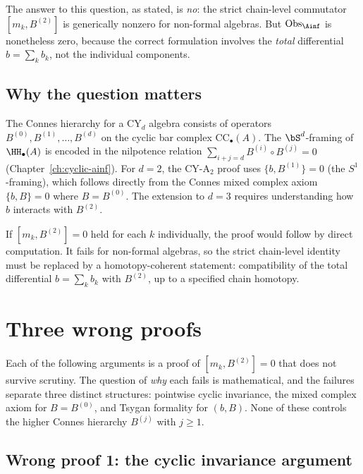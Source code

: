 The answer to this question, as stated, is \emph{no}: the strict
chain-level commutator $[m_k, B^{(2)}]$ is generically nonzero for
non-formal algebras.  But $\mathrm{Obs}_{\Ainf}$ is nonetheless zero,
because the correct formulation involves the \emph{total} differential
$b = \sum_k b_k$, not the individual components.


\subsection{Why the question matters}
\label{subsec:m3b2-why}

The Connes hierarchy for a CY$_d$ algebra consists of operators
$B^{(0)}, B^{(1)}, \ldots, B^{(d)}$ on the cyclic bar complex
$\mathrm{CC}_\bullet(A)$.  The $\bS^d$-framing of $\HH_\bullet(A)$
is encoded in the nilpotence relation
$\sum_{i+j=d} B^{(i)} \circ B^{(j)} = 0$
(Chapter~\ref{ch:cyclic-ainf}).  For $d = 2$, the CY-A$_2$
proof uses $\{b, B^{(1)}\} = 0$ (the $S^1$-framing), which
follows directly from the Connes mixed complex axiom
$\{b, B\} = 0$ where $B = B^{(0)}$.  The extension to $d = 3$
requires understanding how $b$ interacts with $B^{(2)}$.

If $[m_k, B^{(2)}] = 0$ held for each $k$ individually, the
proof would follow by direct computation.  It fails for non-formal
algebras, so the strict chain-level identity must be replaced by
a homotopy-coherent statement: compatibility of the total
differential $b = \sum_k b_k$ with $B^{(2)}$, up to a specified
chain homotopy.


\section{Three wrong proofs}
\label{sec:m3b2-wrong-proofs}

Each of the following arguments is a proof of
$[m_k, B^{(2)}] = 0$ that does not survive scrutiny.  The
question of \emph{why} each fails is mathematical, and the
failures separate three distinct structures: pointwise cyclic
invariance, the mixed complex axiom for $B = B^{(0)}$, and
Tsygan formality for $(b, B)$.  None of these controls the
higher Connes hierarchy $B^{(j)}$ with $j \geq 1$.


\subsection{Wrong proof 1: the cyclic invariance argument}
\label{subsec:wrong-cyclic}

